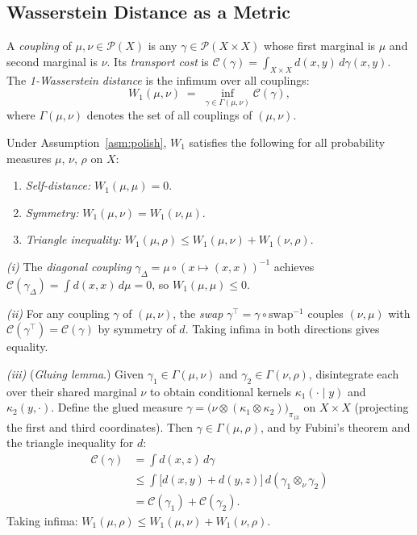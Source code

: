 \documentclass[opre,dblanonrev]{informs4}
\renewenvironment{proof}{\Trivlist\item[\hspace*{1em}\hskip\labelsep{\itshape Proof.\enskip}]\ignorespaces}{\endTrivlist\addvspace{0pt}}
\begin{document}
\subsection{Wasserstein Distance as a Metric}

\begin{definition}\label{def:w1}
A \emph{coupling} of $\mu, \nu \in \mathcal{P}(X)$ is any
$\gamma \in \mathcal{P}(X \times X)$ whose first marginal is $\mu$ and
second marginal is $\nu$.
Its \emph{transport cost} is
$\mathcal{C}(\gamma) = \int_{X \times X} d(x,y)\,d\gamma(x,y)$.
The \emph{1-Wasserstein distance} is the infimum over all couplings:
\[
W_1(\mu,\nu) \;=\; \inf_{\gamma \in \Gamma(\mu,\nu)} \mathcal{C}(\gamma),
\]
where $\Gamma(\mu,\nu)$ denotes the set of all couplings of $(\mu,\nu)$.
\end{definition}

\begin{theorem}[$W_1$ is a pseudometric]\label{thm:w1_metric}
Under Assumption~\ref{asm:polish}, $W_1$ satisfies the following
for all probability measures $\mu$, $\nu$, $\rho$ on $X$:
\begin{enumerate}[label=(\roman*)]
\item \emph{Self-distance:} $W_1(\mu,\mu) = 0$.
\item \emph{Symmetry:} $W_1(\mu,\nu) = W_1(\nu,\mu)$.
\item \emph{Triangle inequality:} $W_1(\mu,\rho) \leq W_1(\mu,\nu) + W_1(\nu,\rho)$.
\end{enumerate}
\end{theorem}

\begin{proof}
\textit{(i)} The \emph{diagonal coupling}
$\gamma_\Delta = \mu \circ (x \mapsto (x,x))^{-1}$ achieves
$\mathcal{C}(\gamma_\Delta) = \int d(x,x)\,d\mu = 0$, so $W_1(\mu,\mu) \leq 0$.

\textit{(ii)} For any coupling $\gamma$ of $(\mu,\nu)$, the \emph{swap}
$\gamma^\top = \gamma \circ \mathrm{swap}^{-1}$ couples $(\nu,\mu)$
with $\mathcal{C}(\gamma^\top) = \mathcal{C}(\gamma)$ by symmetry of $d$.
Taking infima in both directions gives equality.

\textit{(iii)} (\emph{Gluing lemma}.)
Given $\gamma_1 \in \Gamma(\mu,\nu)$ and $\gamma_2 \in \Gamma(\nu,\rho)$,
disintegrate each over their shared marginal $\nu$ to obtain conditional
kernels $\kappa_1(\cdot \mid y)$ and $\kappa_2(y, \cdot)$.
Define the glued measure
$\gamma = \bigl(\nu \otimes (\kappa_1 \otimes \kappa_2)\bigr)_{\pi_{13}}$
on $X \times X$ (projecting the first and third coordinates).
Then $\gamma \in \Gamma(\mu,\rho)$, and by Fubini's theorem
and the triangle inequality for $d$:
\begin{align*}
\mathcal{C}(\gamma)
&= \int d(x,z)\,d\gamma \\
&\leq \int \bigl[d(x,y)+d(y,z)\bigr]\,d(\gamma_1 \otimes_\nu \gamma_2) \\
&= \mathcal{C}(\gamma_1) + \mathcal{C}(\gamma_2).
\end{align*}
Taking infima: $W_1(\mu,\rho) \leq W_1(\mu,\nu) + W_1(\nu,\rho)$.
\end{proof}
\end{document}
